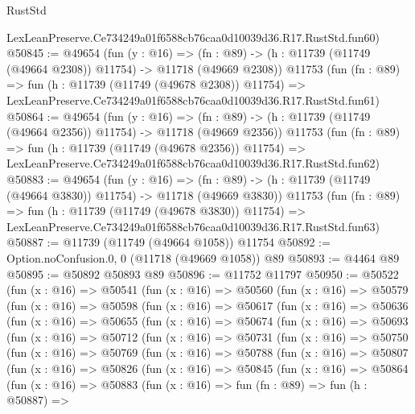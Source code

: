 \begin{lexlean}{RustStd}
\begin{coremodule}
    LexLeanPreserve.Ce734249a01f6588cb76caa0d10039d36.R17.RustStd.fun60)
@50845 := @49654
    (fun (y : @16) =>
    (fn : @89) -> (h : @11739 (@11749 (@49664 @2308)) @11754) -> @11718 (@49669 @2308))
    @11753
    (fun (fn : @89) =>
    fun (h : @11739 (@11749 (@49678 @2308)) @11754) =>
    LexLeanPreserve.Ce734249a01f6588cb76caa0d10039d36.R17.RustStd.fun61)
@50864 := @49654
    (fun (y : @16) =>
    (fn : @89) -> (h : @11739 (@11749 (@49664 @2356)) @11754) -> @11718 (@49669 @2356))
    @11753
    (fun (fn : @89) =>
    fun (h : @11739 (@11749 (@49678 @2356)) @11754) =>
    LexLeanPreserve.Ce734249a01f6588cb76caa0d10039d36.R17.RustStd.fun62)
@50883 := @49654
    (fun (y : @16) =>
    (fn : @89) -> (h : @11739 (@11749 (@49664 @3830)) @11754) -> @11718 (@49669 @3830))
    @11753
    (fun (fn : @89) =>
    fun (h : @11739 (@11749 (@49678 @3830)) @11754) =>
    LexLeanPreserve.Ce734249a01f6588cb76caa0d10039d36.R17.RustStd.fun63)
@50887 := @11739 (@11749 (@49664 @1058)) @11754
@50892 := Option.noConfusion.{0, 0} (@11718 (@49669 @1058)) @89
@50893 := @4464 @89
@50895 := @50892 @50893 @89
@50896 := @11752 @11797
@50950 := @50522
    (fun (x : @16) =>
    @50541
      (fun (x : @16) =>
      @50560
        (fun (x : @16) =>
        @50579
          (fun (x : @16) =>
          @50598
            (fun (x : @16) =>
            @50617
              (fun (x : @16) =>
              @50636
                (fun (x : @16) =>
                @50655
                  (fun (x : @16) =>
                  @50674
                    (fun (x : @16) =>
                    @50693
                      (fun (x : @16) =>
                      @50712
                        (fun (x : @16) =>
                        @50731
                          (fun (x : @16) =>
                          @50750
                            (fun (x : @16) =>
                            @50769
                              (fun (x : @16) =>
                              @50788
                                (fun (x : @16) =>
                                @50807
                                  (fun (x : @16) =>
                                  @50826
                                    (fun (x : @16) =>
                                    @50845
                                      (fun (x : @16) =>
                                      @50864
                                        (fun (x : @16) =>
                                        @50883
                                          (fun (x : @16) =>
                                          fun (fn : @89) =>
                                          fun (h : @50887) =>

\end{coremodule}
\end{lexlean}
